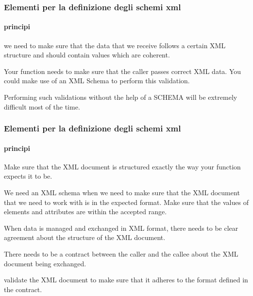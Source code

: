 


\begin{frame}
    \frametitle{Elementi per la definizione degli schemi xml}
    \framesubtitle{principi}
    \addtocounter{nframe}{1}

    we need to make sure that the data that we receive follows a certain XML structure and should contain values which are coherent. 

    Your function needs to make sure that the caller passes correct XML data. You could make use of an XML Schema to perform this validation.

    Performing such validations without the help of a SCHEMA will be extremely difficult most of the time.


\end{frame}

\begin{frame}
    \frametitle{Elementi per la definizione degli schemi xml}
    \framesubtitle{principi}
    \addtocounter{nframe}{1}

    Make sure that the XML document is structured exactly the way your function expects it to be.

   We need an XML schema when we need to make sure that the XML document that we need to work with is in the expected format.
   Make sure that the values of elements and attributes are within the accepted range.

   When data is managed and exchanged in XML format, there needs to be clear agreement about the structure of the XML document.

   There needs to be a contract between the caller and the callee about the XML document being exchanged.

   validate the XML document to make sure that it adheres to the format defined in the contract.


\end{frame}



